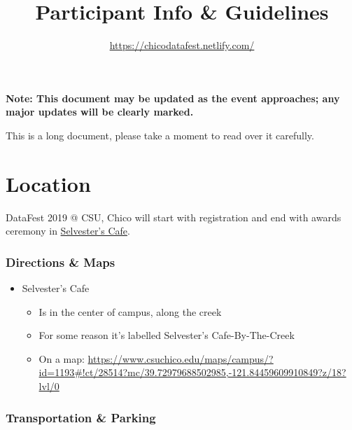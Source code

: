 \documentclass[]{article}
\title{Participant Info \& Guidelines}
\subtitle{\url{https://chicodatafest.netlify.com/}}
\author{}
\date{}
\providecommand{\tightlist}{%
  \setlength{\itemsep}{0pt}\setlength{\parskip}{0pt}}
\begin{document}
\maketitle

\textbf{Note: This document may be updated as the event approaches; any
major updates will be clearly marked.}

This is a long document, please take a moment to read over it carefully.

\hypertarget{location}{%
\section{Location}\label{location}}

DataFest 2019 @ CSU, Chico will start with registration and end with
awards ceremony in
\href{https://www.csuchico.edu/aaspace/commonspaces/selv/index.shtml}{Selvester's
Cafe}.

\hypertarget{directions-maps}{%
\subsubsection{Directions \& Maps}\label{directions-maps}}

\begin{itemize}
\tightlist
\item
  Selvester's Cafe

  \begin{itemize}
  \tightlist
  \item
    Is in the center of campus, along the creek
  \item
    For some reason it's labelled Selvester's Cafe-By-The-Creek
  \item
    On a map:
    \url{https://www.csuchico.edu/maps/campus/?id=1193\#!ct/28514?mc/39.72979688502985,-121.84459609910849?z/18?lvl/0}
  \end{itemize}
\end{itemize}

\hypertarget{transportation-parking}{%
\subsubsection{Transportation \& Parking}\label{transportation-parking}}
\end{document}
